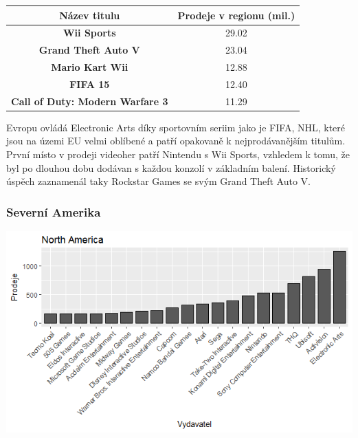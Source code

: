 \documentclass[a4paper,11pt]{article}
\begin{document}
\begin{center}
\begin{tabular}{|c|c|}
\hline
\textbf{Název titulu}                   & \textbf{Prodeje v regionu (mil.)} \\ \hline
\textbf{Wii Sports}                     & 29.02                             \\ \hline
\textbf{Grand Theft Auto V}             & 23.04                             \\ \hline
\textbf{Mario Kart Wii}                 & 12.88                             \\ \hline
\textbf{FIFA 15}                        & 12.40                             \\ \hline
\textbf{Call of Duty: Modern Warfare 3} & 11.29                             \\ \hline
\end{tabular}
\end{center}

Evropu ovládá Electronic Arts díky sportovním seriim jako je FIFA, NHL, které jsou na územi EU velmi oblíbené a patří opakovaně k nejprodávanějším titulům. První místo v prodeji videoher patří Nintendu s Wii Sports, vzhledem k tomu, že byl po dlouhou dobu dodávan s každou konzolí v základním balení. Historický úspěch zaznamenál taky Rockstar Games se svým Grand Theft Auto V.


\newpage

\subsubsection{Severní Amerika}
\includegraphics[scale=0.8]{Rplot11}
\end{document}
